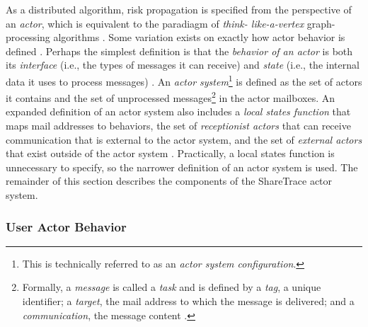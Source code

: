 As a distributed algorithm, risk propagation is specified from the perspective of an \emph{actor}, which is equivalent to the paradiagm of \emph{think- like-a-vertex} graph-processing algorithms \cite{McCune2015}. Some variation exists on exactly how actor behavior is defined \cite{AghaThesis1985, Agha1985, Koster2016}. Perhaps the simplest definition is that the \emph{behavior of an actor} is both its \emph{interface} (i.e., the types of messages it can receive) and \emph{state} (i.e., the internal data it uses to process messages) \cite{Koster2016}. An \emph{actor system}\footnote{This is technically referred to as an \emph{actor system configuration}.} is defined as the set of actors it contains and the set of unprocessed messages\footnote{Formally, a \emph{message} is called a \emph{task} and is defined by a \emph{tag}, a unique identifier; a \emph{target}, the mail address to which the message is delivered; and a \emph{communication}, the message content \cite{AghaThesis1985}.} in the actor mailboxes. An expanded definition of an actor system also includes a \emph{local states function} that maps mail addresses to behaviors, the set of \emph{receptionist actors} that can receive communication that is external to the actor system, and the set of \emph{external actors} that exist outside of the actor system \cite{AghaThesis1985, Agha1985}. Practically, a local states function is unnecessary to specify, so the narrower definition of an actor system is used. The remainder of this section describes the components of the ShareTrace actor system.

\subsubsection{User Actor Behavior}\label{sec:behavior}

